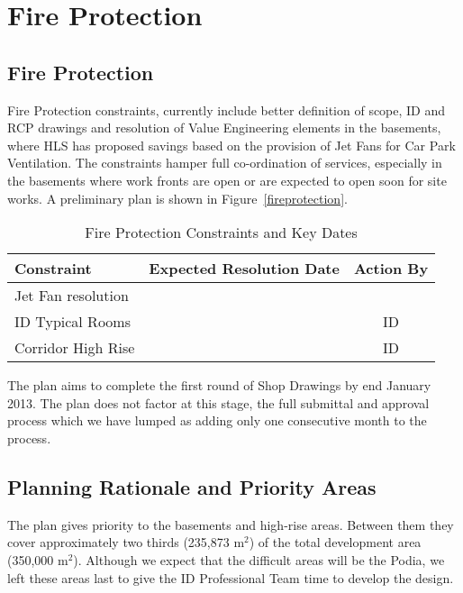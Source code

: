 
%
\chapter{Fire Protection}
\section{Fire Protection}

Fire Protection constraints, currently include better definition of scope, ID and RCP drawings and resolution of Value Engineering elements in the basements, where HLS has proposed savings based on the provision of Jet Fans for Car Park Ventilation. The constraints hamper full co-ordination of services, especially in the basements where work fronts are open or are expected to open soon for site works. A preliminary plan is shown in Figure~\ref{fireprotection}.
\begin{table}[h]
\caption{Fire Protection Constraints and Key Dates}
\begin{tabular}{llc}
\toprule
Constraint         & Expected Resolution Date & Action By\\
\midrule
Jet Fan resolution & &\\
ID Typical Rooms   & & ID\\
Corridor High Rise & & ID\\
\bottomrule
\end{tabular}
\end{table}

The plan aims to complete the first round of Shop Drawings by end January 2013. The plan does not factor at this stage, the full submittal and approval process which we have lumped as adding only one consecutive month to the process.

\section{Planning Rationale and Priority Areas}

The plan gives priority to the basements and high-rise areas. Between them they cover approximately  two thirds (235,873 m$^2$) of the total development area (350,000 m$^2$). Although we expect that the difficult areas will be the Podia, we left these areas last to give the ID Professional Team time to develop the design. 





\pagestyle{empty}

